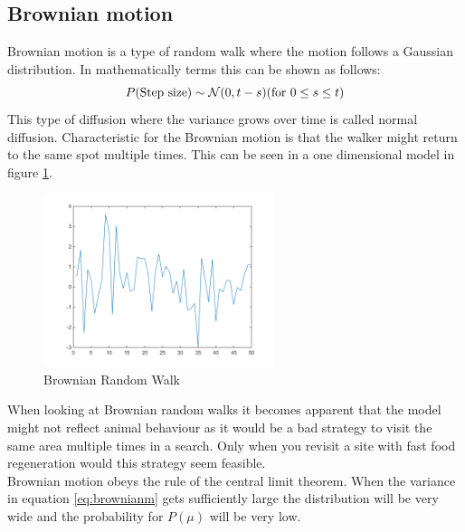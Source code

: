 \subsection{Brownian motion}
Brownian motion is a type of random walk where the motion follows a Gaussian distribution. In mathematically terms this can be shown as follows:
\begin{equation}
P($Step size$) \sim \mathcal{N}(0,t-s) ($for $ 0 \leq s \leq t)
\label{eq:brownianm}
\end{equation}
This type of diffusion where the variance grows over time is called normal diffusion. Characteristic for the Brownian motion is that the walker might return to the same spot multiple times. This can be seen in a one dimensional model in figure \ref{fig:brownianrw}.
\begin{figure}[H]
\centering
\includegraphics[width = 0.6\textwidth]{billeder/brownian}
\caption{Brownian Random Walk}
\label{fig:brownianrw}
\end{figure}
When looking at Brownian random walks it becomes apparent that the model might not reflect animal behaviour as it would be a bad strategy to visit the same area multiple times in a search. 
Only when you revisit a site with fast food regeneration would this strategy seem feasible.\\
Brownian motion obeys the rule of the central limit theorem. When the variance in equation \ref{eq:brownianm} gets sufficiently large the distribution will be very wide and the probability for $P(\mu)$ will be very low.

